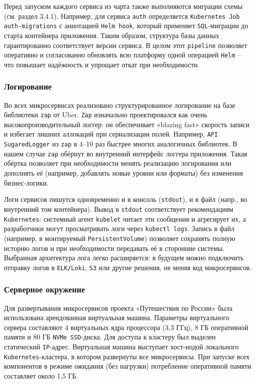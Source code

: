 Перед запуском каждого сервиса из чарта также выполняются миграции схемы (см. раздел 3.4.1). Например, для сервиса \texttt{auth} определяется \texttt{Kubernetes Job auth-migrations} с аннотацией \texttt{Helm hook}, который применяет \texttt{SQL}-миграции до старта контейнера приложения. Таким образом, структура базы данных гарантированно соответствует версии сервиса. В целом этот \texttt{pipeline} позволяет оперативно и согласованно обновлять всю платформу одной операцией \texttt{Helm} – что повышает надёжность и упрощает откат при необходимости.

\subsubsection*{Логирование}
Во всех микросервисах реализовано структурированное логирование на базе библиотеки \texttt{zap} от Uber. \texttt{Zap} изначально проектировался как очень высокопроизводительный логгер: он обеспечивает «blazing fast» скорость записи и избегает лишних аллокаций при сериализации полей. Например, \texttt{API SugaredLogger} из \texttt{zap} в 4–10 раз быстрее многих аналогичных библиотек. В нашем случае \texttt{zap} обёрнут во внутренний интерфейс логгера приложения. Такая обёртка позволяет при необходимости менять реализацию логирования или дополнять её (например, добавлять новые уровни или форматы) без изменения бизнес-логики.

Логи сервисов пишутся одновременно и в консоль (\texttt{stdout}), и в файл (напр., во внутренний том контейнера). Вывод в \texttt{stdout} соответствует рекомендациям \texttt{Kubernetes}: системный агент \texttt{kubelet} читает эти сообщения и агрегирует их, а разработчики могут просматривать логи через \texttt{kubectl logs}. Запись в файл (например, в монтируемый \texttt{PersistentVolume}) позволяет сохранять полную историю логов и при необходимости передавать её в сторонние системы. Выбранная архитектура лога легко расширяется: в будущем можно подключить отправку логов в \texttt{ELK/Loki}, \texttt{S3} или другие решения, не меняя код микросервисов.

\subsubsection*{Серверное окружение}
Для развертывания микросервисов проекта «Путешествия по России» была использована арендованная виртуальная машина. Параметры виртуального сервера составляют 4 виртуальных ядра процессора (3,3 ГГц), 8 ГБ оперативной памяти и 80 ГБ \texttt{NVMe SSD}-диска. Для доступа к кластеру был выделен статический \texttt{IP}-адрес. Виртуальная машина выступает хост-нодой локального \texttt{Kubernetes}-кластера, в котором развернуты все микросервисы. При запуске всех компонентов в режиме ожидания (без нагрузки) потребление оперативной памяти составляет около 1,5 ГБ.

